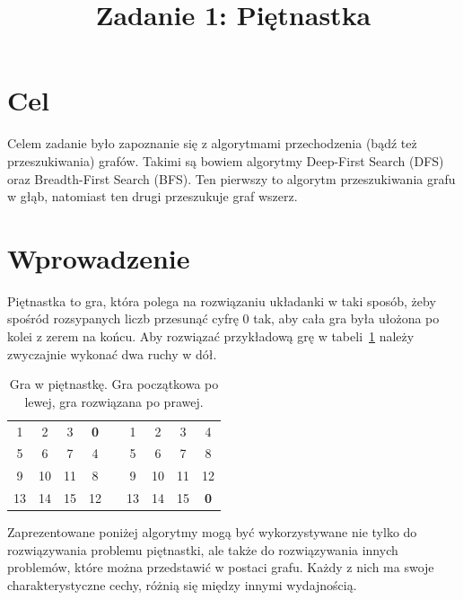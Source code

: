 \documentclass{classrep}
\author{
    \studentinfo{Aleksander Gencel}{251517} \and
    \studentinfo{Bartosz Żelaziński}{251670}
}
\title{Zadanie 1: Piętnastka}
\begin{document}
    \maketitle
    \tableofcontents
    \clearpage


    \section{Cel}\label{sec:cel}
    Celem zadanie było zapoznanie się z algorytmami przechodzenia (bądź też przeszukiwania) grafów.
    Takimi są bowiem algorytmy Deep-First Search (DFS) oraz Breadth-First Search (BFS).
    Ten pierwszy to algorytm przeszukiwania grafu w głąb, natomiast ten drugi przeszukuje graf wszerz.


    \section{Wprowadzenie}\label{sec:wprowadzenie}
    Piętnastka to gra, która polega na rozwiązaniu układanki w taki sposób, żeby spośród rozsypanych liczb przesunąć
    cyfrę 0 tak, aby cała gra była ułożona po kolei z zerem na końcu.
    Aby rozwiązać przykładową grę w tabeli~\ref{tab:fifteen-example} należy zwyczajnie wykonać dwa ruchy w dół.

    \begin{table}[!h]
        \centering
        \begin{tabular}{|c|c|c|c|c|c|c|c|c|}
            \cline{1-4}\cline{6-9}
            1  & 2  & 3  & \textbf{0} & & 1  & 2  & 3  & 4          \\
            \cline{1-4}\cline{6-9}
            5  & 6  & 7  & 4          & & 5  & 6  & 7  & 8          \\
            \cline{1-4}\cline{6-9}
            9  & 10 & 11 & 8          & & 9  & 10 & 11 & 12         \\
            \cline{1-4}\cline{6-9}
            13 & 14 & 15 & 12         & & 13 & 14 & 15 & \textbf{0} \\
            \cline{1-4}\cline{6-9}
        \end{tabular}
        \caption{Gra w piętnastkę. Gra początkowa po lewej, gra rozwiązana po prawej. \cite{freelancinggig}}
        \label{tab:fifteen-example}
    \end{table}

    Zaprezentowane poniżej algorytmy mogą być wykorzystywane nie tylko do rozwiązywania problemu piętnastki,
    ale także do rozwiązywania innych problemów, które można przedstawić w postaci grafu.
    Każdy z nich ma swoje charakterystyczne cechy, różnią się między innymi wydajnością.
\end{document}
